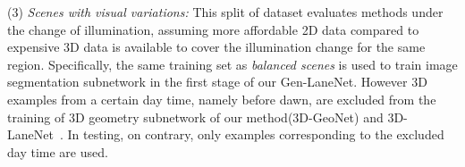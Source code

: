 \documentclass[10pt,twocolumn,letterpaper]{article}
\begin{document}
(3) {\it Scenes with visual variations:} This split of dataset evaluates methods under the change of illumination, assuming more affordable 2D data compared to expensive 3D data is available to cover the illumination change for the same region. Specifically, the same training set as  {\it balanced scenes} is used to train image segmentation subnetwork in the first stage of our Gen-LaneNet. However 3D examples from a certain day time, namely before dawn, are excluded from the training of 3D geometry subnetwork of our method(3D-GeoNet) and 3D-LaneNet~\cite{Garnett:etal:ICCV2019}. In testing, on contrary, only examples corresponding to the excluded day time are used.


\end{document}
